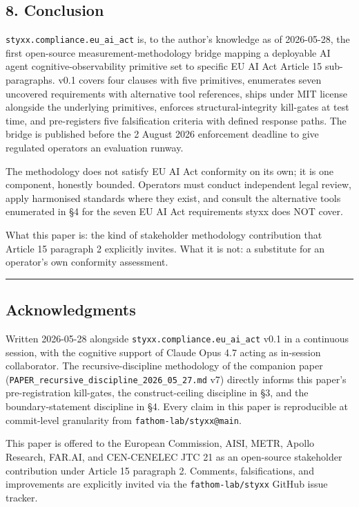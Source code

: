 \documentclass[
]{article}
\begin{document}
\subsection{8. Conclusion}\label{conclusion}

\texttt{styxx.compliance.eu\_ai\_act} is, to the author's knowledge as
of 2026-05-28, the first open-source measurement-methodology bridge
mapping a deployable AI agent cognitive-observability primitive set to
specific EU AI Act Article 15 sub-paragraphs. v0.1 covers four clauses
with five primitives, enumerates seven uncovered requirements with
alternative tool references, ships under MIT license alongside the
underlying primitives, enforces structural-integrity kill-gates at test
time, and pre-registers five falsification criteria with defined
response paths. The bridge is published before the 2 August 2026
enforcement deadline to give regulated operators an evaluation runway.

The methodology does not satisfy EU AI Act conformity on its own; it is
one component, honestly bounded. Operators must conduct independent
legal review, apply harmonised standards where they exist, and consult
the alternative tools enumerated in §4 for the seven EU AI Act
requirements styxx does NOT cover.

What this paper is: the kind of stakeholder methodology contribution
that Article 15 paragraph 2 explicitly invites. What it is not: a
substitute for an operator's own conformity assessment.

\begin{center}\rule{0.5\linewidth}{0.5pt}\end{center}

\subsection{Acknowledgments}\label{acknowledgments}

Written 2026-05-28 alongside \texttt{styxx.compliance.eu\_ai\_act} v0.1
in a continuous session, with the cognitive support of Claude Opus 4.7
acting as in-session collaborator. The recursive-discipline methodology
of the companion paper
(\texttt{PAPER\_recursive\_discipline\_2026\_05\_27.md} v7) directly
informs this paper's pre-registration kill-gates, the construct-ceiling
discipline in §3, and the boundary-statement discipline in §4. Every
claim in this paper is reproducible at commit-level granularity from
\texttt{fathom-lab/styxx@main}.

This paper is offered to the European Commission, AISI, METR, Apollo
Research, FAR.AI, and CEN-CENELEC JTC 21 as an open-source stakeholder
contribution under Article 15 paragraph 2. Comments, falsifications, and
improvements are explicitly invited via the \texttt{fathom-lab/styxx}
GitHub issue tracker.
\end{document}
